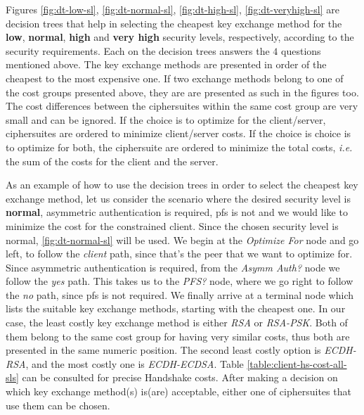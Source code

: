 \documentclass{llncs}
\begin{document}
Figures \ref{fig:dt-low-sl}, \ref{fig:dt-normal-sl}, \ref{fig:dt-high-sl}, \ref{fig:dt-veryhigh-sl} are decision trees that
help in selecting the cheapest key exchange method for the \textbf{low}, \textbf{normal}, \textbf{high} and \textbf{very high}
security levels, respectively, according to the security requirements. Each on the decision trees answers the $4$ questions
mentioned above. The key exchange methods are presented in order of the cheapest to the most expensive one. If two exchange methods
belong to one of the cost groups presented above, they are are presented as such in the figures too. The cost differences between
the ciphersuites within the same cost group are very small and can be ignored. If the choice is to optimize for the client/server,
ciphersuites are ordered to minimize client/server costs. If the choice is choice is to optimize for both, the
ciphersuite are ordered to minimize the total costs, \textit{i.e.} the sum of the costs for the client and the server.

As an example of how to use the decision trees in order to select the cheapest key exchange method, let us consider the scenario
where the desired security level is \textbf{normal}, asymmetric authentication is required, \gls{pfs} is not and we would like to
minimize the cost for the constrained client. Since the chosen security level is normal, \ref{fig:dt-normal-sl} will be used.
We begin at the \textit{Optimize For} node and go left, to follow the \textit{client} path, since that's the peer that we
want to optimize for. Since asymmetric authentication is required, from the \textit{Asymm Auth?} node we follow the \textit{yes}
path. This takes us to the \textit{PFS?} node, where we go right to follow the \textit{no} path, since \gls{pfs} is not required.
We finally arrive at a terminal node which lists the suitable key exchange methods, starting with the cheapest one.
In our case, the least costly key exchange method is either \textit{RSA} or \textit{RSA-PSK}. Both of them belong to the same
cost group for having very similar costs, thus both are presented in the same numeric position. The second least costly option
is \textit{ECDH-RSA}, and the most costly one is \textit{ECDH-ECDSA}. Table \ref{table:client-hs-cost-all-sls} can be consulted for
precise Handshake costs. After making a decision on which key exchange method(s) is(are) acceptable, either one of ciphersuites that
use them can be chosen.
\end{document}
